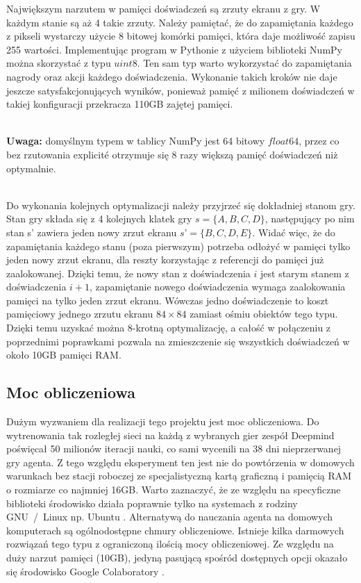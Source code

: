 \documentclass[12pt]{article}
\begin{document}
Największym narzutem w pamięci doświadczeń są zrzuty ekranu z gry. W każdym stanie są aż 4 takie zrzuty. Należy pamiętać, że do zapamiętania każdego z pikseli wystarczy użycie 8 bitowej komórki pamięci, która daje możliwość zapisu 255 wartości. Implementując program w Pythonie z użyciem biblioteki NumPy można skorzystać z typu $uint8$. Ten sam typ warto wykorzystać do zapamiętania nagrody oraz akcji każdego doświadczenia. Wykonanie takich kroków nie daje jeszcze satysfakcjonujących wyników, ponieważ pamięć z milionem doświadczeń w takiej konfiguracji przekracza 110GB zajętej pamięci.
\\\

 \textbf{Uwaga:} domyślnym typem w tablicy NumPy jest 64 bitowy $float64$, przez co bez rzutowania explicité otrzymuje się 8 razy większą pamięć doświadczeń niż optymalnie. 
\\\

Do wykonania kolejnych optymalizacji należy przyjrzeć się dokładniej stanom gry. Stan gry składa się z 4 kolejnych klatek gry $s=\{A, B, C, D\}$, następujący po nim stan s’ zawiera jeden nowy zrzut ekranu $s’=\{B, C, D, E\}$. Widać więc, że do zapamiętania każdego stanu (poza pierwszym)  potrzeba odłożyć w pamięci tylko jeden nowy zrzut ekranu, dla reszty korzystając z referencji do pamięci już zaalokowanej. Dzięki temu, że nowy stan z doświadczenia $i$ jest starym stanem z doświadczenia $i+1$, zapamiętanie nowego doświadczenia wymaga zaalokowania pamięci na tylko jeden zrzut ekranu. Wówczas jedno doświadczenie to koszt pamięciowy jednego zrzutu ekranu $84\times84$ zamiast ośmiu obiektów tego typu. Dzięki temu uzyskać można 8-krotną optymalizację, a całość w połączeniu z poprzednimi poprawkami pozwala na zmieszczenie się wszystkich doświadczeń w około 10GB pamięci RAM.

\subsection{Moc obliczeniowa}
Dużym wyzwaniem dla realizacji tego projektu jest moc obliczeniowa. Do wytrenowania tak rozległej sieci na każdą z wybranych gier zespół Deepmind \cite{deepmind_2} poświęcał 50 milionów iteracji nauki, co sami wycenili na 38 dni nieprzerwanej gry agenta. Z tego względu eksperyment ten jest nie do powtórzenia w domowych warunkach bez stacji roboczej ze specjalistyczną kartą graficzną i pamięcią RAM o rozmiarze co najmniej 16GB. Warto zaznaczyć, że ze względu na specyficzne biblioteki \cite{gym} środowisko działa poprawnie tylko na systemach z rodziny GNU~/~Linux np. Ubuntu \cite{ubuntu}.  Alternatywą do nauczania agenta na domowych komputerach są ogólnodostępne chmury obliczeniowe. Istnieje kilka darmowych rozwiązań tego typu z ograniczoną ilością mocy obliczeniowej. Ze względu na duży narzut pamięci (10GB), jedyną pasującą spośród dostępnych opcji okazało się środowisko Google Colaboratory \cite{colab}. 
\\\
\end{document}
